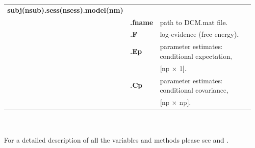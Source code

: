 \begin{tabular}{ l l l }
\bf{subj(nsub).sess(nsess).model(nm)} & & \\
 & \bf{.fname} 	& path to DCM.mat file. \\
 & \bf{.F}		& log-evidence (free energy). \\ 
  & \bf{.Ep}		& parameter estimates: conditional expectation,\\
  & &  [np $\times$ 1]. \\
& \bf{.Cp}		& parameter estimates: conditional covariance,\\
& &  [np $\times$ np]. 
\end{tabular}\\\\

For a detailed description of all the variables and methods please see \cite{dcm_families} and \cite{klaas_bms}.

